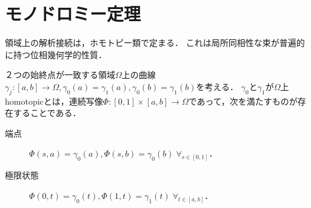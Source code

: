 \documentclass[uplatex, dvipdfmx]{jsreport}
\begin{document}
\section{モノドロミー定理}

\begin{tcolorbox}[colframe=ForestGreen, colback=ForestGreen!10!white,breakable,colbacktitle=ForestGreen!40!white,coltitle=black,fonttitle=\bfseries\sffamily,
title=]
    領域上の解析接続は，ホモトピー類で定まる．
    これは局所同相性な束が普遍的に持つ位相幾何学的性質．
\end{tcolorbox}

２つの始終点が一致する領域$\Omega$上の曲線$\gamma_j:[a,b]\to\Omega,\gamma_0(a)=\gamma_1(a),\gamma_0(b)=\gamma_1(b)$を考える．
$\gamma_0$と$\gamma_1$が$\Omega$上homotopicとは，連続写像$\Phi:[0,1]\times[a,b]\to\Omega$であって，次を満たすものが存在することである．
\begin{description}
    \item[端点] $\Phi(s,a)=\gamma_0(a),\Phi(s,b)=\gamma_0(b)\;\forall_{s\in[0,1]}$．
    \item[極限状態] $\Phi(0,t)=\gamma_0(t),\Phi(1,t)=\gamma_1(t)\;\forall_{t\in[a,b]}$．
\end{description}
\end{document}
